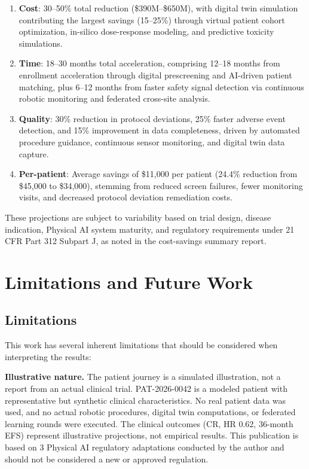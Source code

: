 \begin{enumerate}[leftmargin=*]
\item \textbf{Cost}: 30--50\% total reduction (\$390M--\$650M), with digital twin simulation contributing the largest savings (15--25\%) through virtual patient cohort optimization, in-silico dose-response modeling, and predictive toxicity simulations.

\item \textbf{Time}: 18--30 months total acceleration, comprising 12--18 months from enrollment acceleration through digital prescreening and AI-driven patient matching, plus 6--12 months from faster safety signal detection via continuous robotic monitoring and federated cross-site analysis.

\item \textbf{Quality}: 30\% reduction in protocol deviations, 25\% faster adverse event detection, and 15\% improvement in data completeness, driven by automated procedure guidance, continuous sensor monitoring, and digital twin data capture.

\item \textbf{Per-patient}: Average savings of \$11,000 per patient (24.4\% reduction from \$45,000 to \$34,000), stemming from reduced screen failures, fewer monitoring visits, and decreased protocol deviation remediation costs.
\end{enumerate}

These projections are subject to variability based on trial design, disease indication, Physical AI system maturity, and regulatory requirements under 21 CFR Part 312 Subpart J, as noted in the cost-savings summary report.

\section{Limitations and Future Work}
\label{sec:limitations}

\subsection{Limitations}

This work has several inherent limitations that should be considered when interpreting the results:

\textbf{Illustrative nature.} The patient journey is a simulated illustration, not a report from an actual clinical trial. PAT-2026-0042 is a modeled patient with representative but synthetic clinical characteristics. No real patient data was used, and no actual robotic procedures, digital twin computations, or federated learning rounds were executed. The clinical outcomes (CR, HR 0.62, 36-month EFS) represent illustrative projections, not empirical results. This publication is based on 3 Physical AI regulatory adaptations conducted by the author and should not be considered a new or approved regulation.

